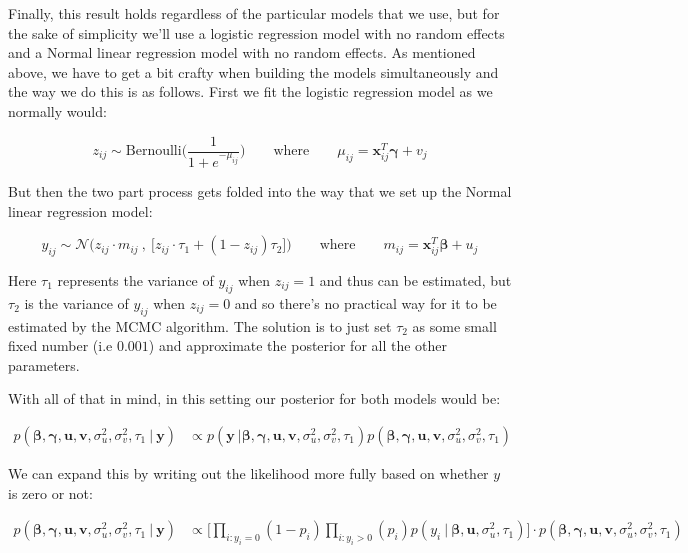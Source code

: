 \documentclass[12pt,twoside]{reedthesis}
\begin{document}
Finally, this result holds regardless of the particular models that we use, but for the sake of simplicity we'll use a logistic regression model with no random effects and a Normal linear regression model with no random effects. As mentioned above, we have to get a bit crafty when building the models simultaneously and the way we do this is as follows. First we fit the logistic regression model as we normally would:

\[
z_{ij} \sim \text{Bernoulli}\Bigg(\frac{1}{1 + e^{-\mu_{ij}}}\Bigg) \qquad \text{where} \qquad \mu_{ij} =\mathbf{x}_{ij}^T\boldsymbol{\gamma} + v_j
\]

But then the two part process gets folded into the way that we set up the Normal linear regression model:

\[
y_{ij} \sim \mathcal{N}\bigg(z_{ij}\cdot m_{ij} \ , \ \Big[z_{ij}\cdot\tau_1 + (1 - z_{ij})\tau_2\Big]\bigg) \qquad \text{where} \qquad m_{ij} =\mathbf{x}_{ij}^T\boldsymbol{\beta} + u_j
\]

Here \(\tau_1\) represents the variance of \(y_{ij}\) when \(z_{ij} = 1\) and thus can be estimated, but \(\tau_2\) is the variance of \(y_{ij}\) when \(z_{ij} = 0\) and so there's no practical way for it to be estimated by the MCMC algorithm. The solution is to just set \(\tau_2\) as some small fixed number (i.e \(0.001\)) and approximate the posterior for all the other parameters.

With all of that in mind, in this setting our posterior for both models would be:

\[
\begin{aligned}
p(\boldsymbol{\beta}, \boldsymbol{\gamma}, \mathbf{u}, \mathbf{v}, \sigma_u^2, \sigma_v^2, \tau_1\ | \ \mathbf{y}) &\propto p(\mathbf{y} \ | \boldsymbol{\beta}, \boldsymbol{\gamma}, \mathbf{u}, \mathbf{v}, \sigma_u^2, \sigma_v^2, \tau_1)p(\boldsymbol{\beta}, \boldsymbol{\gamma}, \mathbf{u}, \mathbf{v}, \sigma_u^2, \sigma_v^2, \tau_1) 
\end{aligned}
\]

We can expand this by writing out the likelihood more fully based on whether \(y\) is zero or not:

\[
\begin{aligned}
p(\boldsymbol{\beta}, \boldsymbol{\gamma}, \mathbf{u}, \mathbf{v}, \sigma_u^2, \sigma_v^2, \tau_1 \ | \ \mathbf{y}) & \propto \bigg[\prod_{i:y_i = 0}(1-p_i)\prod_{i:y_i > 0}(p_i)p(y_i \ | \ \boldsymbol{\beta}, \mathbf{u}, \sigma_u^2, \tau_1)\bigg]\cdot  p(\boldsymbol{\beta}, \boldsymbol{\gamma}, \mathbf{u}, \mathbf{v}, \sigma_u^2, \sigma_v^2, \tau_1)\\
\end{aligned}
\]
\end{document}
